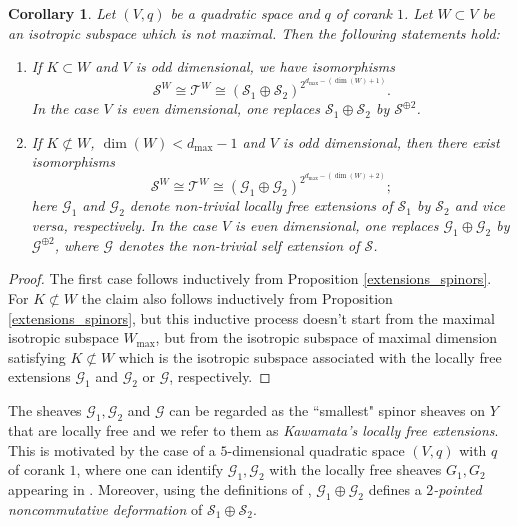 \documentclass[a4paper, twoside, 11pt]{amsart}
\newtheorem{corollary}{Corollary}[theorem]
\theoremstyle{definition}
\theoremstyle{remark}
\numberwithin{equation}{theorem}
\newcommand{\wmax}{W_{\text{max}}}
\begin{document}
\begin{corollary}\label{classification_spinor_corank1}
    Let $(V,q)$ be a quadratic space and $q$ of corank $1$. Let $W \subset V$ be an isotropic subspace which is not maximal. Then the following statements hold:
    \begin{enumerate}[label=\roman*)]
        \item If $K \subset W$ and $V$ is odd dimensional, we have isomorphisms 
        \begin{equation*}
            \mathcal{S}^{W} \cong \mathcal{T}^{W} \cong (\mathcal{S}_1 \oplus \mathcal{S}_2)^{2^{d_{\mathrm{max}} - (\dim(W) +1)}}.
        \end{equation*}
        In the case $V$ is even dimensional, one replaces $\mathcal{S}_1 \oplus \mathcal{S}_2$ by $\mathcal{S}^{\oplus 2}$.
        \item If $K \not\subset W$, $\dim(W) < d_{\mathrm{max}} -1$ and $V$ is odd dimensional, then there exist isomorphisms
        \begin{equation*}
            \mathcal{S}^{W} \cong \mathcal{T}^{W} \cong (\mathcal{G}_1 \oplus \mathcal{G}_2)^{2^{d_{\mathrm{max}} - (\dim(W) +2)}};
        \end{equation*}
        here $\mathcal{G}_1$ and $\mathcal{G}_2$ denote non-trivial locally free extensions of $\mathcal{S}_1$ by $\mathcal{S}_2$ and vice versa, respectively. In the case $V$ is even dimensional, one replaces $\mathcal{G}_1 \oplus \mathcal{G}_2$ by $\mathcal{G}^{\oplus 2}$, where $\mathcal{G}$ denotes the non-trivial self extension of $\mathcal{S}$.
    \end{enumerate}
\end{corollary}
\begin{proof}
    The first case follows inductively from Proposition \ref{extensions_spinors}. For $K \not\subset W$ the claim also follows inductively from Proposition \ref{extensions_spinors}, but this inductive process doesn't start from the maximal isotropic subspace $\wmax$, but from the isotropic subspace of maximal dimension satisfying $ K \not\subset W$ which is the isotropic subspace associated with the locally free extensions $\mathcal{G}_1$ and $\mathcal{G}_2$ or $\mathcal{G}$, respectively.
\end{proof}
    The sheaves $\mathcal{G}_1, \mathcal{G}_2$ and $\mathcal{G}$ can be regarded as the ``smallest" spinor sheaves on $Y$ that are locally free and we refer to them as \textit{Kawamata's locally free extensions}. This is motivated by the case of a $5$-dimensional quadratic space $(V,q)$ with $q$ of corank $1$, where one can identify $\mathcal{G}_1, \mathcal{G}_2$ with the locally free sheaves $G_1,G_2$ appearing in \cite[Lemma 6.2]{Kawamata_SOD_ordinary_double}. Moreover, using the definitions of \cite{Kawamata_nc}, $\mathcal{G}_1 \oplus \mathcal{G}_2$ defines a \textit{$2$-pointed noncommutative deformation} of $\mathcal{S}_1\oplus\mathcal{S}_2$. 
\end{document}
